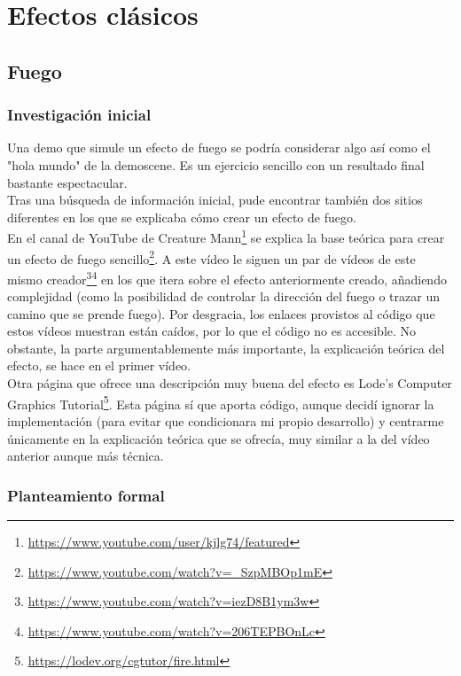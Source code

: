 \chapter{Efectos clásicos}

\section{Fuego}

\subsection{Investigación inicial}

Una demo que simule un efecto de fuego se podría considerar algo así como el "hola mundo" de la demoscene. Es un ejercicio sencillo con un resultado final bastante espectacular.\\

Tras una búsqueda de información inicial, pude encontrar también dos sitios diferentes en los que se explicaba cómo crear un efecto de fuego.\\ 

En el canal de YouTube de Creature Mann\footnote{\url{https://www.youtube.com/user/kjlg74/featured}} se explica la base teórica para crear un efecto de fuego sencillo\footnote{\url{https://www.youtube.com/watch?v=_SzpMBOp1mE}}. A este vídeo le siguen un par de vídeos de este mismo creador\footnote{\url{https://www.youtube.com/watch?v=iezD8B1ym3w}}\footnote{\url{https://www.youtube.com/watch?v=206TEPBOnLc}} en los que itera sobre el efecto anteriormente creado, añadiendo complejidad (como la posibilidad de controlar la dirección del fuego o trazar un camino que se prende fuego). Por desgracia, los enlaces provistos al código que estos vídeos muestran están caídos, por lo que el código no es accesible. No obstante, la parte argumentablemente más importante, la explicación teórica del efecto, se hace en el primer vídeo.\\

Otra página que ofrece una descripción muy buena del efecto es Lode's Computer Graphics Tutorial\footnote{\url{https://lodev.org/cgtutor/fire.html}}. Esta página sí que aporta código, aunque decidí ignorar la implementación (para evitar que condicionara mi propio desarrollo) y centrarme únicamente en la explicación teórica que se ofrecía, muy similar a la del vídeo anterior aunque más técnica.\\

\subsection{Planteamiento formal}

